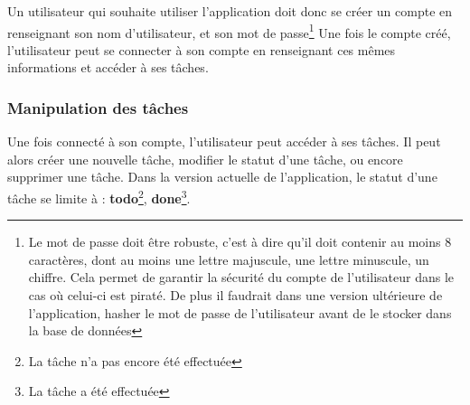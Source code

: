 \documentclass[12pt]{article}
\begin{document}
        Un utilisateur qui souhaite utiliser l'application doit donc se créer un compte en renseignant son nom d'utilisateur,
        et son mot de passe\footnote{Le mot de passe doit être robuste, c'est à dire qu'il doit contenir au moins 8 caractères, dont au moins
        une lettre majuscule, une lettre minuscule, un chiffre. Cela permet de garantir la sécurité du compte de l'utilisateur
        dans le cas où celui-ci est piraté. De plus il faudrait dans une version ultérieure de l'application, hasher le mot de passe de l'utilisateur avant
        de le stocker dans la base de données}
        Une fois le compte créé, l'utilisateur peut se connecter à son compte en renseignant ces mêmes
        informations et accéder à ses tâches.

        \subsubsection{Manipulation des tâches}\label{subsubsec:manipulation-des-taches}
        Une fois connecté à son compte, l'utilisateur peut accéder à ses tâches. Il peut alors créer une nouvelle tâche,
        modifier le statut d'une tâche, ou encore supprimer une tâche. Dans la version actuelle de l'application, le statut
        d'une tâche se limite à : \textbf{todo}\footnote{La tâche n'a pas encore été effectuée}, \textbf{done}\footnote{La tâche a été effectuée}.
\end{document}
